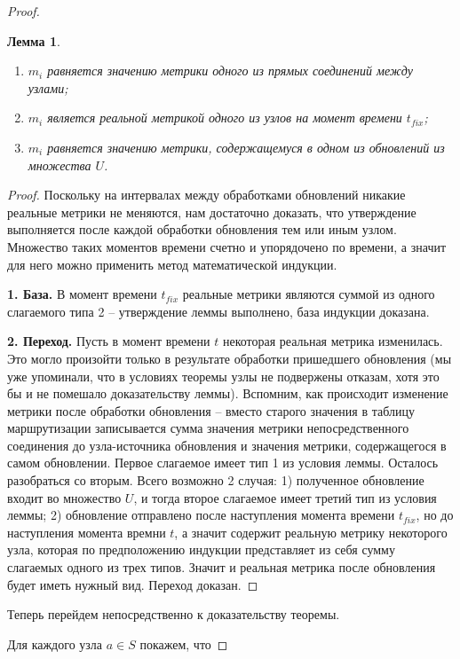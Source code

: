 \documentclass{article}
\theoremstyle{plain}
\theoremstyle{plain}
\theoremstyle{plain}
\newtheorem{lemma}{Лемма}[section]
\theoremstyle{plain}
\theoremstyle{definition}
\theoremstyle{remark}
\theoremstyle{plain}
\begin{document}
\begin{proof}
\begin{lemma}
        \begin{enumerate}
            \item $m_i$ равняется значению метрики одного из прямых соединений между узлами;
            \item $m_i$ является реальной метрикой одного из узлов на момент времени $t_{fix}$;
            \item $m_i$ равняется значению метрики, содержащемуся в одном из обновлений из множества $U$.
        \end{enumerate}
    \end{lemma}
    \begin{proof}
        Поскольку на интервалах между обработками обновлений никакие реальные метрики не меняются, нам достаточно доказать, что утверждение выполняется после каждой обработки обновления тем или иным узлом. Множество таких моментов времени счетно и упорядочено по времени, а значит для него можно применить метод математической индукции.
        
        \textbf{1. База.} В момент времени $t_{fix}$ реальные метрики являются суммой из одного слагаемого типа 2 -- утверждение леммы выполнено, база индукции доказана.
        
        \textbf{2. Переход. } Пусть в момент времени $t$ некоторая реальная метрика изменилась. Это могло произойти только в результате обработки пришедшего обновления (мы уже упоминали, что в условиях теоремы узлы не подвержены отказам, хотя это бы и не помешало доказательству леммы). Вспомним, как происходит изменение метрики после обработки обновления -- вместо старого значения в таблицу маршрутизации записывается сумма значения метрики непосредственного соединения до узла-источника обновления и значения метрики, содержащегося в самом обновлении. Первое слагаемое имеет тип 1 из условия леммы. Осталось разобраться со вторым. Всего возможно 2 случая: 1) полученное обновление входит во множество $U$, и тогда второе слагаемое имеет третий тип из условия леммы; 2) обновление отправлено после наступления момента времени $t_{fix}$, но до наступления момента времни $t$, а значит содержит реальную метрику некоторого узла, которая по предположению индукции представляет из себя сумму слагаемых одного из трех типов. Значит и реальная метрика после обновления будет иметь нужный вид. Переход доказан.
    \end{proof}
    
    Теперь перейдем непосредственно к доказательству теоремы.
    
    Для каждого узла $a \in S$ покажем, что
    

\end{proof}
\end{document}
